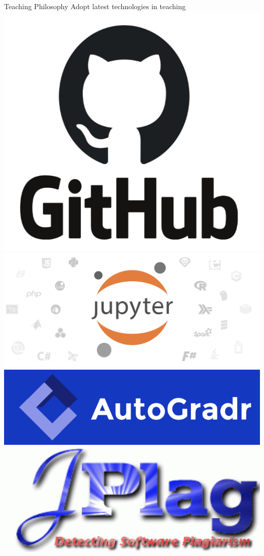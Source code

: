 \documentclass{beamer}
\begin{document}
\begin{frame}[c]{Teaching Philosophy}
	\LARGE
	Adopt latest technologies in teaching
	\includegraphics[scale=0.1]{./images/Github.png}
	\includegraphics[scale=0.1]{./images/Jupyter.png}
	\includegraphics[scale=0.1]{./images/AutoGradr.png}
	\includegraphics[scale=0.1]{./images/JPlag.png}
\end{frame}
\end{document}
